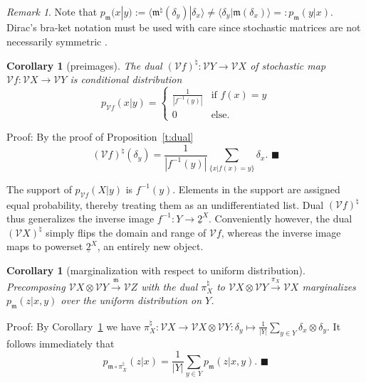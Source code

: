 \documentclass[12pt]{article}
\newcommand{\vecify}{{\mathcal V}}
\newcommand{\bra}{{\langle}}
\newcommand{\ket}{{\rangle}}
\newcommand{\fm}{{\mathfrak m}}
\newtheorem{cor}[thm]{Corollary}
\theoremstyle{remark}
\newtheorem{rem}{Remark}
\begin{document}
\begin{rem}
    \label{r:notdirac}
	Note that $p_\fm(x|y):=\bra \fm^\natural(\delta_y)|
    \delta_x\ket\neq\bra \delta_y|\fm(\delta_x)\ket=:p_\fm(y|x)$. 
    Dirac's bra-ket notation must be used with care since stochastic 
    matrices are not necessarily symmetric \cite{dirac:58}.
\end{rem}

\begin{cor}
	[preimages]
	\label{t:preimage}
	The dual $(\vecify f)^\natural:\vecify Y\rightarrow \vecify X$ of 
    stochastic map $\vecify f:\vecify X\rightarrow \vecify Y$ is 
    conditional distribution
	\begin{equation}
		\label{e:preimage}
		p_{\vecify f}(x|y) = \left\{\begin{matrix}
			\frac{1}{|f^{-1}(y)|} & \mbox{if } f(x)=y\\
			0 &\mbox{else}.
		\end{matrix}\right.
	\end{equation}
\end{cor}

\noindent
Proof:
By the proof of Proposition~\ref{t:dual}
\begin{equation*}
		(\vecify f)^\natural(\delta_y)=
		\frac{1}{|f^{-1}(y)|}\sum_{\{x|f(x)=y\}}\delta_x.
		\,\,\blacksquare
\end{equation*}

The support of $p_{\vecify f}(X|y)$ is $f^{-1}(y)$. Elements in the 
support are assigned equal probability, thereby treating them as an 
undifferentiated list. Dual $(\vecify f)^\natural$ thus generalizes the 
inverse image $f^{-1}:Y\rightarrow \underline{2}^X$. Conveniently however, 
the dual $(\vecify X)^\natural$ simply flips the domain and range of 
$\vecify f$, whereas the inverse image maps to powerset $\underline{2}^X$, 
an entirely new object.

\begin{cor}
	[marginalization with respect to uniform distribution]
	\label{t:marginalize}
	Precomposing $\vecify X\otimes \vecify Y\xrightarrow{\fm}\vecify Z$ 
    with the dual $\pi_X^\natural$ to $\vecify X\otimes\vecify 
    Y\xrightarrow{\pi_X}\vecify X$ marginalizes $p_\fm(z|x,y)$ 
    over the uniform distribution on $Y$.
\end{cor}

\noindent
Proof:
By Corollary~\ref{t:preimage} we have $\pi^\natural_X:\vecify X
\rightarrow \vecify X\otimes \vecify Y:\delta_y\mapsto 
\frac{1}{|Y|}\sum_{y\in Y}\delta_x\otimes \delta_y$. It follows 
immediately that
\begin{equation*}
	p_{\fm\circ\pi^\natural_X}(z|x)=\frac{1}{|Y|}\sum_{y\in Y} 
    p_\fm(z|x,y).
	\,\,\blacksquare
\end{equation*}
\end{document}
